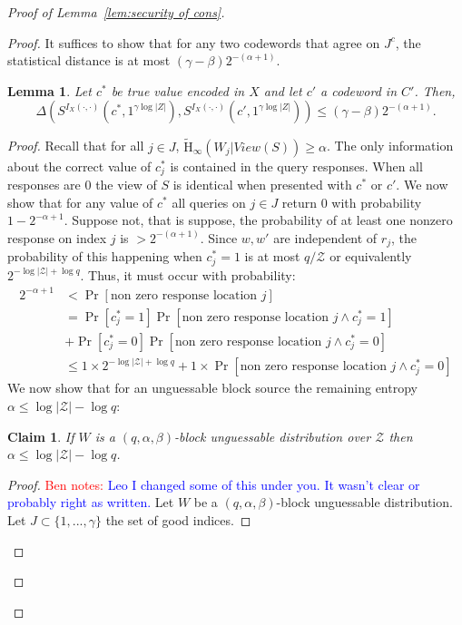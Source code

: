 \documentclass[11pt]{article}
\newcommand{\lemref}[1]{\mbox{Lemma~\ref{#1}}}
\newcommand{\Hav}{\tilde{\mathrm{H}}_\infty}
\newtheorem{lemma}[theorem]{Lemma}
\newtheorem{claim}[theorem]{Claim}
\newcommand{\authnote}[2]{{\textcolor{red}{\textsf{#1 notes: }\textcolor{blue}{ #2}}\marginpar{\textcolor{red}{\textbf{!!!!!}}}}}
\newcommand{\authnote}[2]{}
\newcommand{\bnote}[1]{{\authnote{Ben}{#1}}}
\begin{document}
\begin{proof}[Proof of \lemref{lem:security of cons}]
\begin{proof}
\noindent It suffices to show that for any two codewords that agree on $J^c$, the statistical distance is at most $(\gamma-\beta)2^{-(\alpha+1)}$.
\begin{lemma}
\label{lem:codewords in I close}
Let $c^*$ be true value encoded in $X$ and let $c'$ a codeword in $C'$.  Then,
\[
\Delta( S^{I_X(\cdot, \cdot)}(c^*, 1^{\gamma \log |Z|}), S^{I_X(\cdot, \cdot)}(c', 1^{\gamma \log |Z|})) \le ( \gamma -\beta) 2^{-(\alpha+1)}.
\]
\end{lemma}
\begin{proof}
Recall that for all $j\in J$, $\Hav(W_j | View(S))\geq \alpha$.  The only information about the correct value of $c_j^*$ is contained in the query responses.  When all responses are $0$ the view of $S$ is identical when presented with $c^*$ or $c'$.  We now show that for any value of $c^*$ all queries on $j \in J$ return $0$ with probability $1-2^{-\alpha+1}$.  Suppose not, that is suppose, the probability of at least one nonzero response on index $j$ is $> 2^{-(\alpha+1)}$.  Since $w, w'$ are independent of $r_j$, the probability of this happening when $c^*_j = 1$ is at most $q/\mathcal{Z}$ or  equivalently $2^{-\log |\mathcal{Z}|+\log q}$.  Thus, it must occur with probability:
\begin{align}
2^{-\alpha+1}&<\Pr[\text{non zero response location }j]\nonumber \\
 &= \Pr[c_j^* =1]\Pr[\text{non zero response location }j\wedge c_j^*=1]\nonumber \\&+ \Pr[c_j^*=0] \Pr[\text{non zero response location }j \wedge c_j^*=0]\nonumber \\
&\le 1\times 2^{-\log|\mathcal{Z}|+\log q} + 1\times  \Pr[\text{non zero response location }j \wedge c_j^*=0] \label{eq:ways to remove ent}
\end{align}
We now show that for an unguessable block source the remaining entropy $\alpha\leq \log |\mathcal{Z}|-\log q $:
\begin{claim}
\label{cl:ent bounded away from n}
If $W$ is a $(q, \alpha, \beta)$-block unguessable distribution over $\mathcal{Z}$ then $\alpha \le \log |\mathcal{Z}|-\log q$.
\end{claim}
\begin{proof}
\bnote{Leo I changed some of this under you.  It wasn't clear or probably right as written.}
Let $W$ be a $(q, \alpha, \beta)$-block unguessable distribution.  Let $J\subset\{1,..., \gamma\}$ the set of good indices.

\end{proof}
\end{proof}
\end{proof}
\end{proof}
\end{document}
